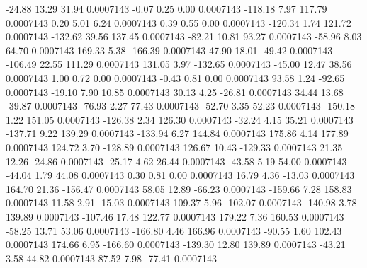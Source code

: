       -24.88       13.29       31.94     0.0007143
       -0.07        0.25        0.00     0.0007143
     -118.18        7.97      117.79     0.0007143
        0.20        5.01        6.24     0.0007143
        0.39        0.55        0.00     0.0007143
     -120.34        1.74      121.72     0.0007143
     -132.62       39.56      137.45     0.0007143
      -82.21       10.81       93.27     0.0007143
      -58.96        8.03       64.70     0.0007143
      169.33        5.38     -166.39     0.0007143
       47.90       18.01      -49.42     0.0007143
     -106.49       22.55      111.29     0.0007143
      131.05        3.97     -132.65     0.0007143
      -45.00       12.47       38.56     0.0007143
        1.00        0.72        0.00     0.0007143
       -0.43        0.81        0.00     0.0007143
       93.58        1.24      -92.65     0.0007143
      -19.10        7.90       10.85     0.0007143
       30.13        4.25      -26.81     0.0007143
       34.44       13.68      -39.87     0.0007143
      -76.93        2.27       77.43     0.0007143
      -52.70        3.35       52.23     0.0007143
     -150.18        1.22      151.05     0.0007143
     -126.38        2.34      126.30     0.0007143
      -32.24        4.15       35.21     0.0007143
     -137.71        9.22      139.29     0.0007143
     -133.94        6.27      144.84     0.0007143
      175.86        4.14      177.89     0.0007143
      124.72        3.70     -128.89     0.0007143
      126.67       10.43     -129.33     0.0007143
       21.35       12.26      -24.86     0.0007143
      -25.17        4.62       26.44     0.0007143
      -43.58        5.19       54.00     0.0007143
      -44.04        1.79       44.08     0.0007143
        0.30        0.81        0.00     0.0007143
       16.79        4.36      -13.03     0.0007143
      164.70       21.36     -156.47     0.0007143
       58.05       12.89      -66.23     0.0007143
     -159.66        7.28      158.83     0.0007143
       11.58        2.91      -15.03     0.0007143
      109.37        5.96     -102.07     0.0007143
     -140.98        3.78      139.89     0.0007143
     -107.46       17.48      122.77     0.0007143
      179.22        7.36      160.53     0.0007143
      -58.25       13.71       53.06     0.0007143
     -166.80        4.46      166.96     0.0007143
      -90.55        1.60      102.43     0.0007143
      174.66        6.95     -166.60     0.0007143
     -139.30       12.80      139.89     0.0007143
      -43.21        3.58       44.82     0.0007143
       87.52        7.98      -77.41     0.0007143
